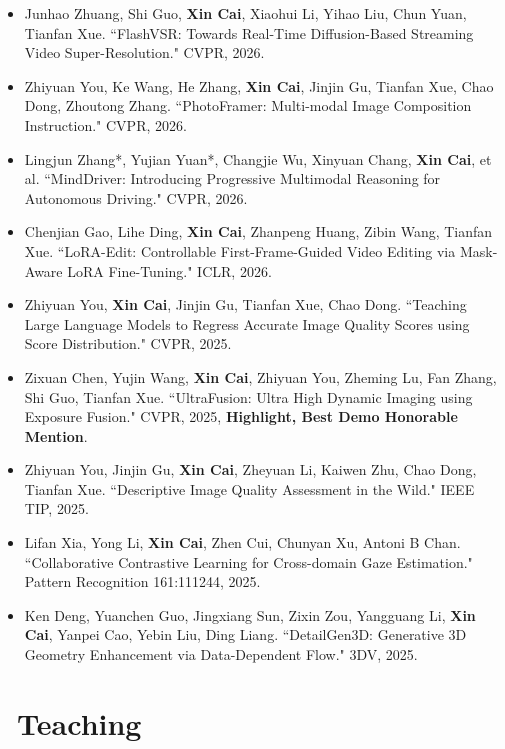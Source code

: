 \documentclass{resume}
\begin{document}
\begin{itemize}[parsep=0.5ex]
  \item Junhao Zhuang, Shi Guo, \textbf{Xin Cai}, Xiaohui Li, Yihao Liu, Chun Yuan, Tianfan Xue. ``FlashVSR: Towards Real-Time Diffusion-Based Streaming Video Super-Resolution." CVPR, 2026.

  \item Zhiyuan You, Ke Wang, He Zhang, \textbf{Xin Cai}, Jinjin Gu, Tianfan Xue, Chao Dong, Zhoutong Zhang. ``PhotoFramer: Multi-modal Image Composition Instruction." CVPR, 2026.

  \item Lingjun Zhang*, Yujian Yuan*, Changjie Wu, Xinyuan Chang, \textbf{Xin Cai}, et al. ``MindDriver: Introducing Progressive Multimodal Reasoning for Autonomous Driving." CVPR, 2026.

  \item Chenjian Gao, Lihe Ding, \textbf{Xin Cai}, Zhanpeng Huang, Zibin Wang, Tianfan Xue. ``LoRA-Edit: Controllable First-Frame-Guided Video Editing via Mask-Aware LoRA Fine-Tuning." ICLR, 2026.

  \item Zhiyuan You, \textbf{Xin Cai}, Jinjin Gu, Tianfan Xue, Chao Dong. ``Teaching Large Language Models to Regress Accurate Image Quality Scores using Score Distribution." CVPR, 2025.

  \item Zixuan Chen, Yujin Wang, \textbf{Xin Cai}, Zhiyuan You, Zheming Lu, Fan Zhang, Shi Guo, Tianfan Xue. ``UltraFusion: Ultra High Dynamic Imaging using Exposure Fusion." CVPR, 2025, \textbf{Highlight, Best Demo Honorable Mention}.

  \item Zhiyuan You, Jinjin Gu, \textbf{Xin Cai}, Zheyuan Li, Kaiwen Zhu, Chao Dong, Tianfan Xue. ``Descriptive Image Quality Assessment in the Wild." IEEE TIP, 2025.

  \item Lifan Xia, Yong Li, \textbf{Xin Cai}, Zhen Cui, Chunyan Xu, Antoni B Chan. ``Collaborative Contrastive Learning for Cross-domain Gaze Estimation." Pattern Recognition 161:111244, 2025.

  \item Ken Deng, Yuanchen Guo, Jingxiang Sun, Zixin Zou, Yangguang Li, \textbf{Xin Cai}, Yanpei Cao, Yebin Liu, Ding Liang. ``DetailGen3D: Generative 3D Geometry Enhancement via Data-Dependent Flow." 3DV, 2025.

\end{itemize}

\section{\faBook\  Teaching}
\end{document}
